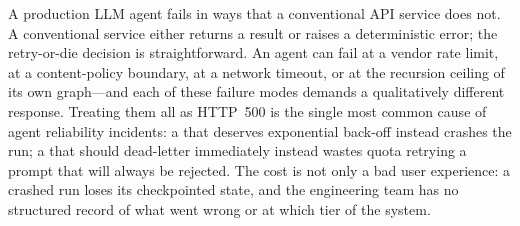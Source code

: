 


A production LLM agent fails in ways that a conventional API service does
not. A conventional service either returns a result or raises a
deterministic error; the retry-or-die decision is straightforward. An agent
can fail at a vendor rate limit, at a content-policy boundary, at a network
timeout, or at the recursion ceiling of its own graph---and each of these
failure modes demands a qualitatively different response. Treating them all
as HTTP~500 is the single most common cause of agent reliability incidents:
a  that deserves exponential back-off instead crashes
the run; a  that should dead-letter
immediately instead wastes quota retrying a prompt that will always be
rejected. The cost is not only a bad user experience: a crashed run loses
its checkpointed state, and the engineering team has no structured record of
what went wrong or at which tier of the system.

